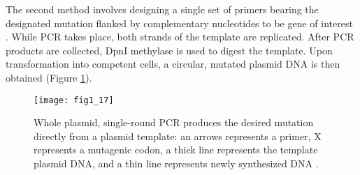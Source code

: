 \begin{refsection}
The second method involves designing a single set of primers bearing the
designated mutation flanked by complementary nucleotides to be gene of interest
\cite{Arnold2003}. While PCR takes place, both strands of the template are
replicated. After PCR products are collected, DpnI methylase is used to
digest the template.  Upon transformation into competent cells, a circular,
mutated plasmid DNA is then obtained \cite{Antikainen2005a} (Figure
\ref{fig:sdm-2}).
\begin{figure}[htbp] \centering \texttt{[image: fig1\_17]}
    \caption[Whole plasmid, single-round PCR produces the desired mutation
    directly from a plasmid template: an arrows represents a primer, X
    represents a mutagenic codon, a thick line represents the template plasmid
    DNA, and a thin line represents newly synthesized DNA.]{Whole plasmid,
        single-round PCR produces the desired mutation directly from a plasmid
        template: an arrows represents a primer, X represents a mutagenic
        codon, a thick line represents the template plasmid DNA, and a thin
        line represents newly synthesized DNA \cite{Antikainen2005a}.}
        \label{fig:sdm-2}
\end{figure}


\end{refsection}
